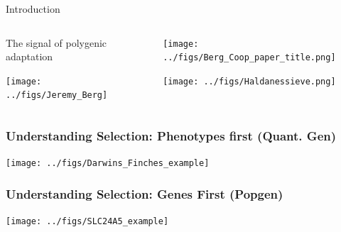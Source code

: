 \documentclass{beamer}
\begin{document}
\begin{frame}{Introduction}
\begin{columns}
\begin{column}{0.5\textwidth}
The signal of polygenic adaptation\\
	\begin{center} \texttt{[image: ../figs/Jeremy\_Berg]} \end{center}
\end{column}
\begin{column}{0.5\textwidth}
\pause 

	\begin{center} \texttt{[image: ../figs/Berg\_Coop\_paper\_title.png]} \end{center}

	\begin{center} \texttt{[image: ../figs/Haldanessieve.png]} \end{center}

\end{column}
\end{columns}
\end{frame}


\begin{frame}
	\frametitle{Understanding Selection: Phenotypes first (Quant. Gen)}
			\begin{center} 	\texttt{[image: ../figs/Darwins\_Finches\_example]} \end{center}
\end{frame}

\begin{frame}
	\frametitle{Understanding Selection: Genes First (Popgen)}
			\begin{center} \texttt{[image: ../figs/SLC24A5\_example]} \end{center}
\end{frame}


\end{document}
